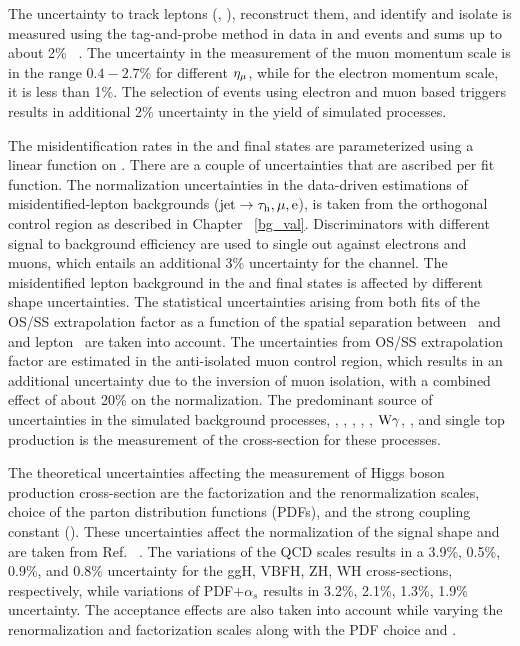 The uncertainty to track leptons (\Pe, \Pgm), reconstruct them, and identify and isolate is measured using the tag-and-probe method in data in \Zee and \Zmm events and sums up to about 2\% ~\cite{Chatrchyan:2012xi, Khachatryan:2015hwa, Khachatryan:2015dfa, CMS:2016gvn}. The uncertainty in the measurement of the muon momentum scale is in the range $0.4-2.7\%$ for different $\eta_{\mu}$, while for the electron momentum scale, it is less than 1\%. The selection of events using electron and muon based triggers results in additional 2\% uncertainty in the yield of simulated processes.

The misidentification rates in the \ehad and \muhad final states are parameterized using a linear function on \tauh \pt. There are a couple of uncertainties that are ascribed per fit function. The normalization uncertainties in the data-driven estimations of misidentified-lepton backgrounds ($\text{jet}\to\tau_{\text{h}}, \mu, \text{e}$), is taken from the orthogonal control region as described in Chapter ~\ref{bg_val}. Discriminators with different signal to background efficiency are used to single out  \tauh against electrons and muons, which entails an additional 3\% uncertainty for the \ehad channel. The misidentified lepton background in the \emu and \mue final states is affected by different shape uncertainties. The statistical uncertainties arising from both fits of the OS/SS extrapolation factor as a function of the spatial separation between \Pe\, and \Pgm\, and lepton \pt\, are taken into account. The uncertainties from OS/SS extrapolation factor are estimated in the anti-isolated muon control region, which results in an additional uncertainty due to the inversion of muon isolation, with a combined effect of about 20\% on the normalization.  The predominant source of uncertainties in the simulated background processes, \Zee, \Zmm, \Ztt, \PW{}\PW, \PZ{}\PZ, $\text{W}\gamma$, \ttbar, and single top production is the measurement of the cross-section for these processes.

The theoretical uncertainties affecting the measurement of Higgs boson production cross-section are the factorization and the renormalization scales, choice of the parton distribution functions (PDFs), and the strong coupling constant (\as). These uncertainties affect the normalization of the signal shape and are taken from Ref. ~\cite{deFlorian:2016spz}. The variations of the QCD scales results in a 3.9\%, 0.5\%, 0.9\%, and 0.8\% uncertainty for the ggH, VBFH, ZH, WH cross-sections, respectively, while variations of PDF$+\alpha_s$ results in 3.2\%, 2.1\%, 1.3\%, 1.9\% uncertainty. The acceptance effects are also taken into account while varying the renormalization and factorization scales along with the PDF choice and \as.

